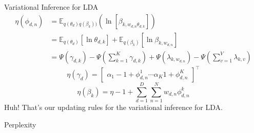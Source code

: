 \documentclass{beamer}
\newcommand\mat[1]{\begin{bmatrix}#1\end{bmatrix}}
\begin{document}
\begin{frame}[allowframebreaks]{Variational Inference for LDA}
\framebreak
\begin{align*}
\eta(\phi_{d,n}) & = \mathbb{E}_{q(\theta_d) q(\beta_k))}(\ln [\beta_{k, w_{d,n}\theta_{d,k}}]) \\
& = \mathbb{E}_{q(\theta_d)}[\ln \theta_{d,k}] + \mathbb{E}_{q(\beta_k)}[\ln \beta_{k, w_{d,n}}] \\ 
& = \Psi(\gamma_{d,k}) - \Psi(\sum_{k=1}^K \gamma_{d,k}) + \Psi(\lambda_{k,w_{d,n}}) - \Psi(\sum_{v=1}^V \lambda_{k,v})
\end{align*}
$$\eta(\gamma_d) = \mat{\alpha_1 - 1 + \phi_{d,n}^1 \cdots \alpha_K 1 + \phi_{d,n}^K}^\top$$
$$\eta(\beta_k) = \eta -1 + \sum_{d=1}^D\sum_{n=1}^N w_{d,n} \phi_{d,n}^k$$
Huh! That's our updating rules for the variational inference for LDA.

\end{frame}
\begin{frame}{Perplexity}


\end{frame}
\end{document}
